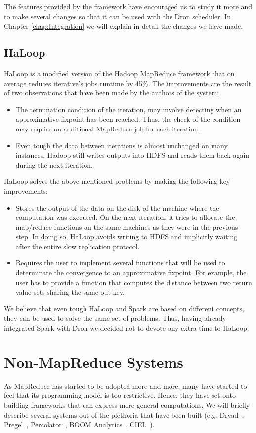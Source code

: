 \documentclass[11pt,a4paper,twoside]{report}
\begin{document}
The features provided by the framework have encouraged us to study it more and to make several changes so that it can be used with the Dron scheduler. In Chapter \ref{chap:Integration} we will explain in detail the changes we have made.

\subsection{HaLoop}
HaLoop is a modified version of the Hadoop MapReduce framework that on average reduces iterative's jobs runtime by 45\%. The improvements are the result of two observations that have been made by the authors of the system:

\begin{itemize}
\item{}
The termination condition of the iteration, may involve detecting when an approximative fixpoint has been reached. Thus, the check of the condition may require an additional MapReduce job for each iteration.
\item{}
Even tough the data between iterations is almost unchanged on many instances, Hadoop still writes outputs into HDFS and reads them back again during the next iteration.
\end{itemize}


HaLoop solves the above mentioned problems by making the following key
improvements:
\begin{itemize}
\item{}
Stores the output of the data on the disk of the machine where the computation was executed. On the next iteration, it tries to allocate the map/reduce functions on the same machines as they were in the previous step. In doing so, HaLoop avoids writing to HDFS and implicitly waiting after the entire slow replication protocol.
\item{}
Requires the user to implement several functions that will be used to determinate the convergence to an approximative fixpoint. For example, the user has to provide a function that computes the distance between two return value sets sharing the same out key.
\end{itemize}


We believe that even tough HaLoop and Spark are based on different concepts, they can be used to solve the same set of problems. Thus, having already integrated Spark with Dron we decided not to devote any extra time to HaLoop.

\section{Non-MapReduce Systems}
As MapReduce has started to be adopted more and more, many have started to feel that its programming model is too restrictive. Hence, they have set onto building frameworks that can express more general computations. We will briefly describe several systems out of the plethoria that have been built (e.g. Dryad~\cite{Dryad,DryadLinq}, Pregel~\cite{Pregel}, Percolator~\cite{Percolator}, BOOM Analytics~\cite{Boom}, CIEL~\cite{Ciel}). 
\end{document}
